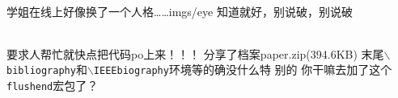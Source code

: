 \documentclass{article}
\newcommand{\emoji}[1]{\texttt{[image: twitter/\#1]}}%
\newcommand{\myverb}[1]{\texttt{$\backslash$#1}}
\begin{document}
\newpage
{}%
\begin{qqminipage}
  \\%
  {学姐在线上好像换了一个人格……}{imgs/eye}%
  {知道就好，别说破，别说破}%
\end{qqminipage}
\newpage
\begin{qqminipage}
  \\%
  {要求人帮忙就快点把代码po上来！！！}%
  {分享了档案paper.zip(394.6KB)}%
  {末尾\myverb{bibliography}和\myverb{IEEEbiography}环境等的确没什么特
    别的}%
  {你干嘛去加了这个\texttt{flushend}宏包了？}%
\end{qqminipage}
\end{document}
